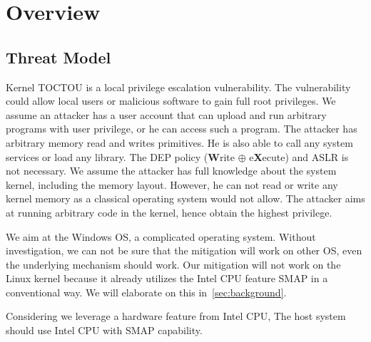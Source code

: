 \section{Overview}
\label{sec:overview}

\subsection{Threat Model}
\label{sec:threatmodel}

Kernel TOCTOU is a local privilege escalation vulnerability. The vulnerability could allow local users or malicious software to gain full root privileges. We assume an attacker has a user account that can upload and run arbitrary programs with user privilege, or he can access such a program. The attacker has arbitrary memory read and writes primitives. He is also able to call any system services or load any library. The DEP policy (\textbf{W}rite $\oplus$ e\textbf{X}ecute) and ASLR is not necessary. We assume the attacker has full knowledge about the system kernel, including the memory layout. However, he can not read or write any kernel memory as a classical operating system would not allow. The attacker aims at running arbitrary code in the kernel, hence obtain the highest privilege. 

We aim at the Windows OS, a complicated operating system. Without investigation,  we can not be sure that the mitigation will work on other OS, even the underlying mechanism should work. Our mitigation will not work on the Linux kernel because it already utilizes the Intel CPU feature SMAP in a conventional way. We will elaborate on this in~\autoref{sec:background}.

Considering we leverage a hardware feature from Intel CPU, The host system should use Intel CPU with SMAP capability.
